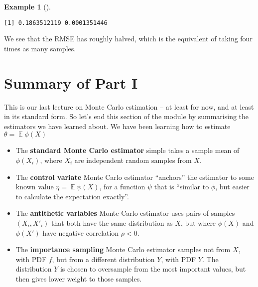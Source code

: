 \documentclass[
  letterpaper,
  DIV=11,
  numbers=noendperiod]{scrreprt}
\newcommand{\Exg}{\operatorname{\mathbb{E}}}
\theoremstyle{plain}
\theoremstyle{definition}
\theoremstyle{definition}
\newtheorem{example}{Example}[chapter]
\theoremstyle{remark}
\begin{document}
\begin{example}[]
\begin{verbatim}
[1] 0.1863512119 0.0001351446
\end{verbatim}

We see that the RMSE has roughly halved, which is the equivalent of
taking four times as many samples.

\end{example}

\section{Summary of Part I}\label{summary-of-part-i}

This is our last lecture on Monte Carlo estimation -- at least for now,
and at least in its standard form. So let's end this section of the
module by summarising the estimators we have learned about. We have been
learning how to estimate \(\theta = \Exg \phi(X)\)

\begin{itemize}
\item
  The \textbf{standard Monte Carlo estimator} simple takes a sample mean
  of \(\phi(X_i)\), where \(X_i\) are independent random samples from
  \(X\).
\item
  The \textbf{control variate} Monte Carlo estimator ``anchors'' the
  estimator to some known value \(\eta = \Exg \psi(X)\), for a function
  \(\psi\) that is ``similar to \(\phi\), but easier to calculate the
  expectation exactly''.
\item
  The \textbf{antithetic variables} Monte Carlo estimator uses pairs of
  samples \((X_i, X'_i)\) that both have the same distribution as \(X\),
  but where \(\phi(X)\) and \(\phi(X')\) have negative correlation
  \(\rho < 0\).
\item
  The \textbf{importance sampling} Monte Carlo estimator samples not
  from \(X\), with PDF \(f\), but from a different distribution \(Y\),
  with PDF \(Y\). The distribution \(Y\) is chosen to oversample from
  the most important values, but then gives lower weight to those
  samples.
\end{itemize}
\end{document}
